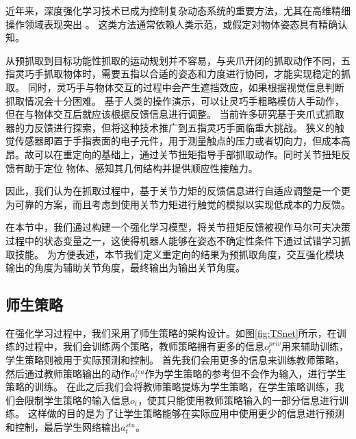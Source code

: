 近年来，深度强化学习技术已成为控制复杂动态系统的重要方法，尤其在高维精细操作领域表现突出
\cite{sheLearningHighDOFReachingandgrasping2022}\cite{christenDgraspPhysicallyPlausible2022}。
这类方法通常依赖人类示范\cite{rajeswaranLearningComplexDexterous2017}，或假定对物体姿态具有精确认知。

从预抓取到目标功能性抓取的运动规划并不容易，与夹爪开闭的抓取动作不同，五指灵巧手抓取物体时，需要五指以合适的姿态和力度进行协同，才能实现稳定的抓取。
同时，灵巧手与物体交互的过程中会产生遮挡效应，如果根据视觉信息判断抓取情况会十分困难。
基于人类的操作演示，可以让灵巧手粗略模仿人手动作，但在与物体交互后就应该根据反馈信息进行调整。
当前许多研究基于夹爪式抓取器的力反馈进行探索\cite{vulinImprovedLearningRobot2021}，但将这种技术推广到五指灵巧手面临重大挑战。
狭义的触觉传感器即置于手指表面的电子元件，用于测量触点的压力或者切向力，但成本高昂。故可以在重定向的基础上，通过关节扭矩指导手部抓取动作。同时关节扭矩反馈有助于定位
物体、感知其几何结构并提供顺应性接触力。

因此，我们认为在抓取过程中，基于关节力矩的反馈信息进行自适应调整是一个更为可靠的方案，而且考虑到使用关节力矩进行触觉的模拟以实现低成本的力反馈\cite{tian_adaptive_2024}。

在本节中，我们通过构建一个强化学习模型，将关节扭矩反馈被视作马尔可夫决策过程中的状态变量之一，这使得机器人能够在姿态不确定性条件下通过试错学习抓取技能。
为方便表述，本节我们定义重定向的结果为预抓取角度，交互强化模块输出的角度为辅助关节角度，最终输出为输出关节角度。
\subsection{师生策略}
在强化学习过程中，我们采用了师生策略的架构设计。如图\ref{fig:TSnet}所示，在训练的过程中，我们会训练两个策略，教师策略拥有更多的信息$o_t^{priv}$用来辅助训练，学生策略则被用于实际预测和控制。
首先我们会用更多的信息来训练教师策略，然后通过教师策略输出的动作$a_t^{tea}$作为学生策略的参考但不会作为输入，进行学生策略的训练。
在此之后我们会将教师策略提炼为学生策略，在学生策略训练，我们会限制学生策略的输入信息$o_t$，使其只能使用教师策略输入的一部分信息进行训练。
这样做的目的是为了让学生策略能够在实际应用中使用更少的信息进行预测和控制，最后学生网络输出$a_t^{stu}$。

